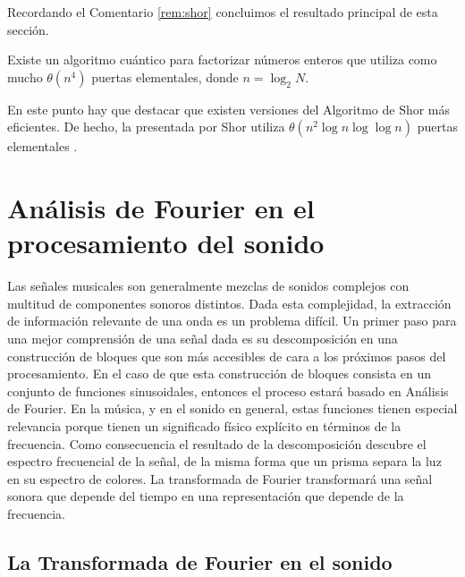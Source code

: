 \documentclass{article}
\begin{document}
 Recordando  el Comentario \ref{rem:shor} concluimos el resultado principal de esta sección.

\begin{theorem}
  Existe un algoritmo cuántico para factorizar números enteros que utiliza como mucho $\theta(n^4)$ puertas elementales, donde $n = \log_2 N$.
\end{theorem}

En este punto hay que destacar que existen versiones del Algoritmo de Shor más eficientes. De hecho, la presentada por Shor utiliza $\theta(n^2 \log n \log \log n)$ puertas elementales \cite{shor}.


\newpage


\section{Análisis de Fourier en el procesamiento del sonido} \label{sec:sonido}

Las señales musicales son generalmente mezclas de sonidos complejos con multitud de componentes sonoros distintos. Dada esta complejidad, la extracción de información relevante de una onda es un problema difícil. Un primer paso para una mejor comprensión de una señal dada es su descomposición en una construcción de bloques que son más accesibles de cara a los próximos pasos del procesamiento. En el caso de que esta construcción de bloques consista en un conjunto de funciones sinusoidales, entonces el proceso estará basado en Análisis de Fourier. En la música, y en el sonido en general, estas funciones tienen especial relevancia porque tienen un significado físico explícito en términos de la frecuencia. Como consecuencia el resultado de la descomposición descubre el espectro frecuencial de la señal, de la misma forma que un prisma separa la luz en su espectro de colores. La transformada de Fourier transformará una señal sonora que depende del tiempo en una representación que depende de la frecuencia.

\subsection{La Transformada de Fourier en el sonido}
\end{document}
